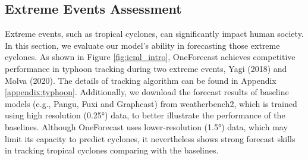 \subsection{Extreme Events Assessment}
    Extreme events, such as tropical cyclones, can significantly impact human society. In this section, we evaluate our model's ability in forecasting those extreme cyclones. As shown in Figure \ref{fig:icml_intro}, OneForecast achieves competitive performance in typhoon tracking during two extreme events, Yagi (2018) and Molva (2020). The details of tracking algorithm can be found in Appendix \ref{appendix:typhoon}. Additionally, we download the forecast results of baseline models (e.g., Pangu, Fuxi and Graphcast) from weatherbench2, which is trained using high resolution (0.25°) data, to better illustrate the performance of the baselines. Although OneForecast uses lower-resolution (1.5°) data, which may limit its capacity to predict cyclones, it nevertheless shows strong forecast skills in tracking tropical cyclones comparing with the baselines. 

    

